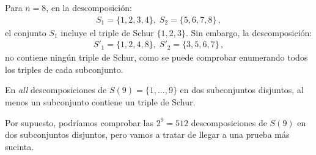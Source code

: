 \begin{example} Para $n=8$, en la descomposición:
\begin{align}
S_1 = \{1,2,3,4\},\; S_2 = \{5,6,7,8\}\,,
\label{eq.schur0}
\end{align}
el conjunto $S_1$ incluye el triple de Schur $\{1,2,3\}$.
Sin embargo, la descomposición:
\begin{align}
S'_1 = \{1,2,4,8\},\; S'_2 = \{3,5,6,7\}\,,
\label{eq:schur1}
\end{align}
no contiene ningún triple de Schur, como se puede comprobar enumerando todos los triples de cada subconjunto.
\end{example}

\begin{theorem}
En \emph{all} descomposiciones de $S(9)=\{1,\ldots,9\}$ en dos subconjuntos disjuntos, al menos un subconjunto contiene un triple de Schur.
\end{theorem}
Por supuesto, podríamos comprobar las $2^9=512$ descomposiciones de $S(9)$ en dos subconjuntos disjuntos, pero vamos a tratar de llegar a una prueba más sucinta.
